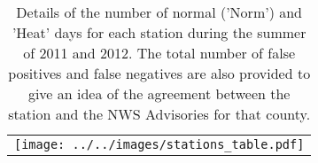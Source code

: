 \documentclass{ametsoc}
\begin{document}
%



\begin{table}
\caption{Details of the number of normal ('Norm') and 'Heat' days for each station during the summer of 2011 and 2012.  The total number of false positives and false negatives are also provided to give an idea of the agreement between the station and the NWS Advisories for that county.}
\begin{center}
\begin{tabular}{c}
\texttt{[image: ../../images/stations\_table.pdf]} 
\end{tabular}
\label{tab:citystats}
\end{center}
\end{table}


%
\end{document}
